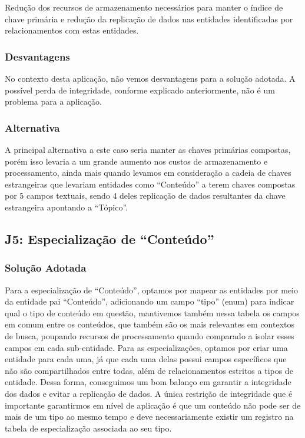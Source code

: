 Redução dos recursos de armazenamento necessários para manter o índice de chave
primária e redução da replicação de dados nas entidades identificadas por
relacionamentos com estas entidades.

\subsubsection{Desvantagens}

No contexto desta aplicação, não vemos desvantagens para a solução adotada. A
possível perda de integridade, conforme explicado anteriormente, não é um
problema para a aplicação.

\subsubsection{Alternativa}

A principal alternativa a este caso seria manter as chaves primárias compostas,
porém isso levaria a um grande aumento nos custos de armazenamento e
processamento, ainda mais quando levamos em consideração a cadeia de chaves
estrangeiras que levariam entidades como ``Conteúdo'' a terem chaves compostas
por 5 campos textuais, sendo 4 deles replicação de dados resultantes da chave
estrangeira apontando a ``Tópico''.

\subsection{\textbf{J5:} Especialização de ``Conteúdo''}

\subsubsection{Solução Adotada}

Para a especialização de ``Conteúdo'', optamos por mapear as entidades por meio
da entidade pai ``Conteúdo'', adicionando um campo ``tipo'' (enum) para indicar
qual o tipo de conteúdo em questão, mantivemos também nessa tabela os campos em
comum entre os conteúdos, que também são os mais relevantes em contextos de
busca, poupando recursos de processamento quando comparado a isolar esses
campos em cada sub-entidade. Para as especializações, optamos por criar uma
entidade para cada uma, já que cada uma delas possui campos específicos que não
são compartilhados entre todas, além de relacionamentos estritos a tipos de
entidade. Dessa forma, conseguimos um bom balanço em garantir a integridade dos
dados e evitar a replicação de dados. A única restrição de integridade que é
importante garantirmos em nível de aplicação é que um conteúdo não pode ser de
mais de um tipo ao mesmo tempo e deve necessariamente existir um registro na
tabela de especialização associada ao seu tipo.

